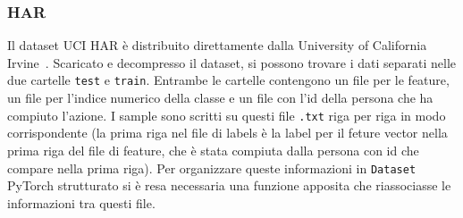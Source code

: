 \subsubsection{HAR}
Il dataset UCI HAR è distribuito direttamente dalla University of 
California Irvine~\cite{uci_har_ds}. Scaricato e decompresso il 
dataset, si possono trovare i dati separati nelle due cartelle 
\texttt{test} e \texttt{train}. Entrambe le cartelle contengono un 
file per le feature, un file per l'indice numerico della classe e un 
file con l'id della persona che ha compiuto l'azione. I sample sono 
scritti su questi file \texttt{.txt} riga per riga in modo 
corrispondente (la prima riga nel file di labels è la label per il 
feture vector nella prima riga del file di feature, che è stata 
compiuta dalla persona con id che compare nella prima riga). Per 
organizzare queste informazioni in \texttt{Dataset} PyTorch strutturato 
si è resa necessaria una funzione apposita che riassociasse le 
informazioni tra questi file.

